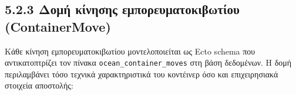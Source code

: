 \subsection{5.2.3 Δομή κίνησης εμπορευματοκιβωτίου
(ContainerMove)}\label{ux3b4ux3bfux3bcux3ae-ux3baux3afux3bdux3b7ux3c3ux3b7ux3c2-ux3b5ux3bcux3c0ux3bfux3c1ux3b5ux3c5ux3bcux3b1ux3c4ux3bfux3baux3b9ux3b2ux3c9ux3c4ux3afux3bfux3c5-containermove}

Κάθε κίνηση εμπορευματοκιβωτίου μοντελοποιείται ως Ecto schema που
αντικατοπτρίζει τον πίνακα \texttt{ocean\_container\_moves} στη βάση
δεδομένων. Η δομή περιλαμβάνει τόσο τεχνικά χαρακτηριστικά του κοντέινερ
όσο και επιχειρησιακά στοιχεία αποστολής:

\begin{Shaded}
\begin{Highlighting}[]
 
\FunctionTok{(}\NormalTok{, }\NormalTok{, } \FunctionTok{())}
\FunctionTok{(}\NormalTok{, }\NormalTok{, } \FunctionTok{())}
\FunctionTok{(}\NormalTok{, }\FunctionTok{)}
\FunctionTok{(}\NormalTok{, }\FunctionTok{)}
\FunctionTok{(}\NormalTok{, }\FunctionTok{)}

\FunctionTok{(}\NormalTok{, }\FunctionTok{)}
\FunctionTok{(}\NormalTok{, }\FunctionTok{)}
\FunctionTok{(}\NormalTok{, }\FunctionTok{)}
\FunctionTok{(}\NormalTok{, }\FunctionTok{)}
\FunctionTok{(}\NormalTok{, }\FunctionTok{)}

\FunctionTok{()}


\end{Highlighting}
\end{Shaded}

